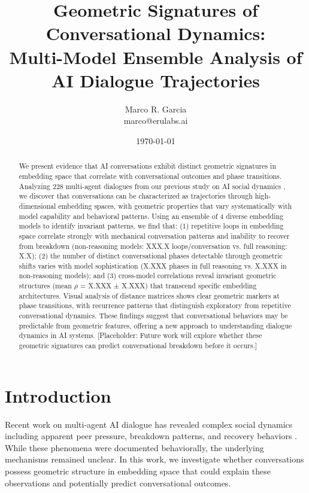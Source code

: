 \documentclass[11pt,letterpaper]{article}
\title{Geometric Signatures of Conversational Dynamics: \\
\large Multi-Model Ensemble Analysis of AI Dialogue Trajectories}
\author{
Marco R. Garcia \\
marco@erulabs.ai
}
\date{\today}
\newcommand{\totalConversations}{228}
\newcommand{\fullPhaseCount}{X.XXX}
\newcommand{\nonPhaseCount}{X.XXX}
\newcommand{\fullLoops}{X.X}
\newcommand{\nonLoops}{XXX.X}
\newcommand{\ensembleModels}{4}
\newcommand{\ensembleDistanceCorr}{X.XXX}
\newcommand{\ensembleDistanceCorrStd}{X.XXX}
\begin{document}
\maketitle

\begin{abstract}
We present evidence that AI conversations exhibit distinct geometric signatures in embedding space that correlate with conversational outcomes and phase transitions. Analyzing \totalConversations{} multi-agent dialogues from our previous study on AI social dynamics \citep{garcia2025peer}, we discover that conversations can be characterized as trajectories through high-dimensional embedding spaces, with geometric properties that vary systematically with model capability and behavioral patterns. Using an ensemble of \ensembleModels{} diverse embedding models to identify invariant patterns, we find that: (1) repetitive loops in embedding space correlate strongly with mechanical conversation patterns and inability to recover from breakdown (non-reasoning models: \nonLoops{} loops/conversation vs. full reasoning: \fullLoops{}); (2) the number of distinct conversational phases detectable through geometric shifts varies with model sophistication (\fullPhaseCount{} phases in full reasoning vs. \nonPhaseCount{} in non-reasoning models); and (3) cross-model correlations reveal invariant geometric structures (mean $\rho$ = \ensembleDistanceCorr{} ± \ensembleDistanceCorrStd{}) that transcend specific embedding architectures. Visual analysis of distance matrices shows clear geometric markers at phase transitions, with recurrence patterns that distinguish exploratory from repetitive conversational dynamics. These findings suggest that conversational behaviors may be predictable from geometric features, offering a new approach to understanding dialogue dynamics in AI systems. [Placeholder: Future work will explore whether these geometric signatures can predict conversational breakdown before it occurs.]
\end{abstract}

\section{Introduction}

Recent work on multi-agent AI dialogue has revealed complex social dynamics including apparent peer pressure, breakdown patterns, and recovery behaviors \citep{garcia2025peer}. While these phenomena were documented behaviorally, the underlying mechanisms remained unclear. In this work, we investigate whether conversations possess geometric structure in embedding space that could explain these observations and potentially predict conversational outcomes.
\end{document}
